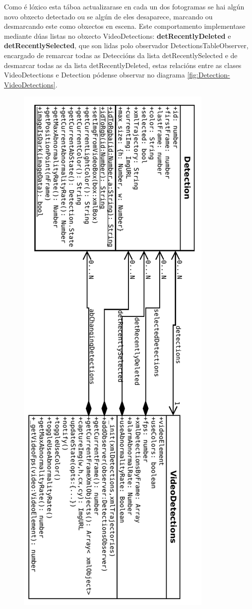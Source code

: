         Como é lóxico esta táboa actualizarase en cada un dos fotogramas se hai algún novo obxecto 
        detectado ou se algún de eles desaparece, marcando ou desmarcando este como obxectos en escena.
        Este comportamento implementase mediante dúas listas no obxecto VideoDetections: 
        \textbf{detRecentlyDeleted} e \textbf{detRecentlySelected}, que son lidas polo observador 
        DetectionsTableObserver, encargado de remarcar todas as Deteccións da lista detRecentlySelected
        e de desmarcar todas as da lista detRecentlyDeleted, estas relacións entre as clases 
        VideoDetections e Detection pódense observar no diagrama \ref{fig:Detection-VideoDetections}.
        
        \begin{figure}[htp]
        \begin{center}
            \includegraphics[scale=1]{figures/Detection-VideoDetections.pdf}

\end{center}
\end{figure}
